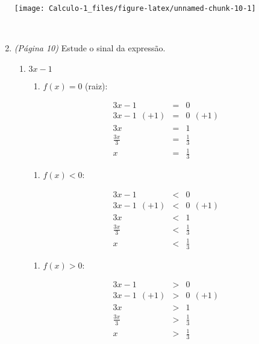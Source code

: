 \documentclass[]{book}
\providecommand{\tightlist}{%
  \setlength{\itemsep}{0pt}\setlength{\parskip}{0pt}}
\begin{document}
\begin{enumerate}
  \begin{center}\texttt{[image: Calculo-1\_files/figure-latex/unnamed-chunk-10-1]} \end{center}

  ~
\item
  \emph{(Página 10)} Estude o sinal da expressão.

  \begin{enumerate}
  \def\labelenumii{\alph{enumii})}
  \item
    \(3x-1\)

    \begin{enumerate}
    \def\labelenumiii{\roman{enumiii})}
    \tightlist
    \item
      \(f(x) = 0\) (raiz):
    \end{enumerate}

    \begin{eqnarray}
    3x-1 &=& 0 \nonumber \\
    3x-1 \ \ (+1) &=& 0 \ \ (+1) \nonumber \\
    3x &=& 1 \nonumber \\
    \frac{3x}{3} &=& \frac{1}{3} \nonumber \\
    x &=& \frac{1}{3} \nonumber
    \end{eqnarray}

    \begin{enumerate}
    \def\labelenumiii{\roman{enumiii})}
    \setcounter{enumiii}{1}
    \tightlist
    \item
      \(f(x) < 0\):
    \end{enumerate}

    \begin{eqnarray}
    3x-1 &<& 0 \nonumber \\
    3x-1 \ \ (+1) &<& 0 \ \ (+1) \nonumber \\
    3x &<& 1 \nonumber \\
    \frac{3x}{3} &<& \frac{1}{3} \nonumber \\
    x &<& \frac{1}{3} \nonumber
    \end{eqnarray}

    \begin{enumerate}
    \def\labelenumiii{\roman{enumiii})}
    \setcounter{enumiii}{2}
    \tightlist
    \item
      \(f(x) > 0\):
    \end{enumerate}

    \begin{eqnarray}
    3x-1 &>& 0 \nonumber \\
    3x-1 \ \ (+1) &>& 0 \ \ (+1) \nonumber \\
    3x &>& 1 \nonumber \\
    \frac{3x}{3} &>& \frac{1}{3} \nonumber \\
    x &>& \frac{1}{3} \nonumber
    \end{eqnarray}
  \end{enumerate}


\end{enumerate}
\end{document}
